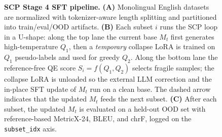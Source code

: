 \begin{figure}[t]
{%
}
\caption{\textbf{SCP Stage 4 SFT pipeline.}
\textbf{(A)} Monolingual English datasets are normalized with tokenizer-aware
length splitting and partitioned into train/eval/OOD artifacts.
\textbf{(B)} Each subset $i$ runs the SCP loop in a U-shape: along the top
lane the current base $M_t$ first generates high-temperature $Q_1$, then a
\emph{temporary} collapse LoRA is trained on $Q_1$ pseudo-labels and used
for greedy $Q_2$. Along the bottom lane the reference-free QE score
$S_i = f(Q_1, Q_2)$ selects fragile samples; the collapse LoRA is unloaded
so the external LLM correction and the in-place SFT update of $M_t$ run on a
clean base. The dashed arrow indicates that the updated $M_t$ feeds the next
subset.
\textbf{(C)} After each subset, the updated $M_t$ is evaluated on a held-out
OOD set with reference-based MetricX-24, BLEU, and chrF, logged on the
\texttt{subset\_idx} axis.}
\label{fig:scp-pipeline}
\end{figure}
